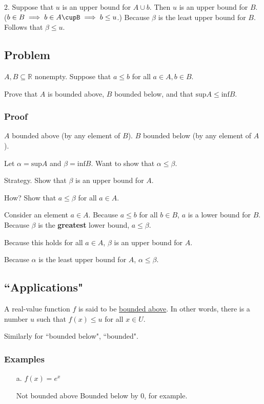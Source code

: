 \documentclass[12pt]{article}
\begin{document}
\begin{flushleft}
2. Suppose that $u$ is an upper bound for $A \cup b$. Then $u$ is an upper bound for $B$. ($b \in B \implies b \in A\cupB \implies b \leq u$.) Because $\beta$ is the least upper bound for $B$. Follows that $\beta \leq u$.

\subsection*{Problem}
$A, B \subseteq \mathbb{R}$ nonempty.
Suppose that $a \leq b$ for all $a \in A, b\in B$.

Prove that $A$ is bounded above, $B$ bounded below, and that $\text{sup}A \leq \text{inf}B$.
\subsubsection*{Proof}
$A$ bounded above (by any element of $B$). $B$ bounded below (by any element of $A$).

Let $\alpha = \text{sup}A$ and $\beta = \text{inf}B$. Want to show that $\alpha \leq \beta$.

Strategy. Show that $\beta$ is an upper bound for $A$.

How? Show that $a \leq \beta$ for all $a \in A$.

Consider an element $a \in A$. Because $a \leq b$ for all $b\in B$, $a$ is a lower bound for $B$. Because $\beta$ is the \textbf{greatest} lower bound, $a \leq \beta$.

Because this holds for all $a \in A$, $\beta$ is an upper bound for $A$.

Because $\alpha$ is the least upper bound for $A$, $\alpha \leq \beta$.

\subsection*{``Applications"}
A real-value function $f$ is said to be \underline{bounded above}. In other words, there is a number $u$ such that $f(x) \leq u$ for all $x \in U$.

Similarly for ``bounded below", ``bounded".

\subsubsection*{Examples}
\begin{itemize}
\item[a.] $f(x) = e^x$

Not bounded above
Bounded below by $0$, for example.


\end{itemize}
\end{flushleft}
\end{document}
